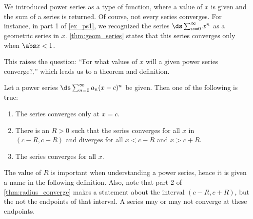We introduced power series as a type of function, where a value of $x$ is given and the sum of a series is returned. Of course, not every series converges. For instance, in part 1 of \autoref{ex_ps1}, we recognized the series $\ds \sum_{n=0}^\infty x^n$ as a geometric series in $x$. \autoref{thm:geom_series} states that this series converges only when $\abs x<1$. 

This raises the question: ``For what values of $x$ will a given power series converge?,'' which  leads us to a theorem and definition.

\begin{theorem}\label{thm:radius_converge}
Let a power series $\ds \sum_{n=0}^\infty a_n(x-c)^n$ be given. Then one of the following is true:
\begin{enumerate}
	\item The series converges only at $x=c$.
	\item	There is an $R>0$ such that the series converges for all $x$ in \\	
	$(c-R,c+R)$ and diverges for all $x<c-R$ and $x>c+R$.
	\item	The series converges for all $x$.
\end{enumerate}
\end{theorem}

	
The value of $R$ is important when understanding a power series, hence it is given a name in the following definition. Also, note that part 2 of \autoref{thm:radius_converge} makes a statement about the interval $(c-R,c+R)$, but the not the endpoints of that interval. A series may or may not converge at these endpoints.
	
